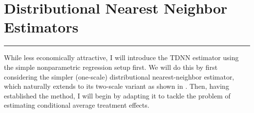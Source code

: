 \section{Distributional Nearest Neighbor Estimators}\label{sec:TDNN}
\hrule
While less economically attractive, I will introduce the TDNN estimator using the simple nonparametric regression setup first.
We will do this by first considering the simpler (one-scale) distributional nearest-neighbor estimator, which naturally extends to its two-scale variant as shown in \citet{demirkaya_optimal_2024}.
Then, having established the method, I will begin by adapting it to tackle the problem of estimating conditional average treatment effects.

